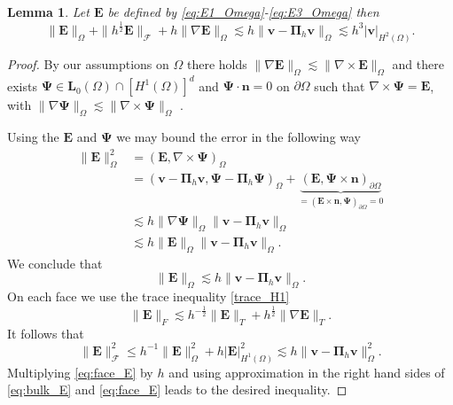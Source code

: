 \documentclass[10pt]{amsart}
\numberwithin{equation}{section}
\newtheorem{lemma}[theorem]{Lemma}
\theoremstyle{definition}
\theoremstyle{remark}
\renewcommand{\(}{\bigl(}
\renewcommand{\)}{\bigr)}
\newcommand{\bld}[1]{\boldsymbol{#1}}
\newcommand{\bv}{\bld{v}}
\newcommand{\bn}{\bld{n}}
\newcommand{\bE}{\bld{E}}
\newcommand{\bPi}{\bld{\Pi}}
\newcommand{\bL}{\bld{L}}
\newcommand{\bPsi}{{\bm \Psi}}
\begin{document}
%
\begin{lemma}\label{lem:weak_approx}
Let $\bE$ be defined by
\eqref{eq:E1_Omega}-\eqref{eq:E3_Omega} then
\begin{equation}\label{eq:E_approx1}
\|\bE\|_\Omega + \|h^{\frac12} \bE\|_{\mathcal{F}} + h \|\nabla \bE\|_\Omega  \lesssim h \|\bv - \bPi_h \bv\|_\Omega \lesssim h^{3} |\bv|_{H^2(\Omega)}.
\end{equation}
%
\end{lemma}
\begin{proof}

By our assumptions on $\Omega$ there holds $\|\nabla \bE\|_\Omega
\lesssim \|\nabla \times \bE\|_\Omega$ and there exists $\bPsi \in
\bL_0(\Omega) \cap [H^1(\Omega)]^d$  and
$\bPsi \cdot \bn = 0$ on $\partial \Omega$ such that $\nabla \times \bPsi = \bE$, with
$\|\nabla \bPsi\|_\Omega \lesssim \|\nabla \times \bPsi\|_\Omega$  \cite[Theorem 3.12]{ABDG98}.

Using the $\bE$ and $\bPsi$ we may bound the error in the following way
\begin{align*}
\|\bE\|_\Omega^2 &= (\bE , \nabla \times \bPsi)_\Omega  
\\
&= (\bv - \bPi_h \bv
,\bPsi - \bPi_h \bPsi)_\Omega + \underbrace{(\bE, \bPsi \times
  \bn)_{\partial \Omega}}_{ = (\bE \times \bn, \bPsi)_{\partial \Omega}
  = 0}
\\
&\lesssim  h \|\nabla \bPsi\|_\Omega \|\bv - \bPi_h \bv \|_\Omega 
\\
&\lesssim h \|\bE\|_\Omega \|\bv - \bPi_h \bv \|_\Omega.
\end{align*}
We conclude that 
\begin{equation}\label{eq:bulk_E}
\|\bE\|_\Omega \lesssim  h \|\bv - \bPi_h \bv\|_\Omega.
\end{equation}
On each face we use the trace inequality \eqref{trace_H1}
\[
\| \bE\|_F \lesssim h^{-\frac12} \|\bE\|_T + h^{\frac12} \|\nabla \bE\|_{T}.
\]
It follows that
\begin{equation}\label{eq:face_E}
\|\bE\|_{\mathcal{F}}^2 \leq h^{-1} \| \bE\|^2_\Omega + h
|\bE|_{H^1(\Omega)}^2 \lesssim h  \|\bv - \bPi_h \bv\|_\Omega^2.
\end{equation}
Multiplying \eqref{eq:face_E} by $h$ and using approximation in the
right hand sides of \eqref{eq:bulk_E} and \eqref{eq:face_E}
leads to the desired inequality.
\end{proof}
%
\end{document}
